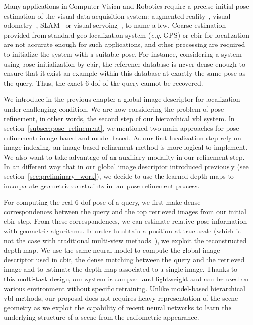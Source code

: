Many applications in Computer Vision and Robotics require a precise initial pose estimation of the visual data acquisition system: augmented reality~\citep{Arth2015}, visual odometry~\citep{Pascoe2015a}, SLAM~\citep{Milford2012} or visual servoing~\citep{Marchand2016}, to name a few. Coarse estimation provided from standard geo-localization system (\textit{e.g.} GPS) or \ac{cbir} for localization are not accurate enough for such applications, and other processing are required to initialize the system with a suitable pose. For instance, considering a system using pose initialization by \ac{cbir}, the reference database is never dense enough to ensure that it exist an example within this database at exactly the same pose as the query. Thus, the exact 6-\ac{dof} of the query cannot be recovered.

We introduce in the previous chapter a global image descriptor for localization under challenging condition. We are now considering the problem of pose refinement, in other words, the second step of our hierarchical \ac{vbl} system. In section~\ref{subsec:pose_refinement}, we mentioned two main approaches for pose refinement: image-based and model based. As our first localization step rely on image indexing, an image-based refinement method is more logical to implement. We also want to take advantage of an auxiliary modality in our refinement step. In an different way that in our global image descriptor introduced previously (see section~\ref{sec:preliminary_work}), we decide to use the learned depth maps to incorporate geometric constraints in our pose refinement process. 

For computing the real 6-\ac{dof} pose of a query, we first make dense correspondences between the query and the top retrieved images from our initial \ac{cbir} step. From these correspondences, we can estimate relative pose information with geometric algorithms. In order to obtain a position at true scale (which is not the case with traditional multi-view methods~\citep{Hartley2003}), we exploit the reconstructed depth map. We use the same neural model to compute the global image descriptor used in \ac{cbir}, the dense matching between the query and the retrieved image and to estimate the depth map associated to a single image. Thanks to this multi-task design, our system is compact and lightweight and can be used on various environment without specific retraining. Unlike model-based hierarchical \ac{vbl} methods, our proposal does not requires heavy representation of the scene geometry as we exploit the capability of recent neural networks to learn the underlying structure of a scene from the radiometric appearance.

